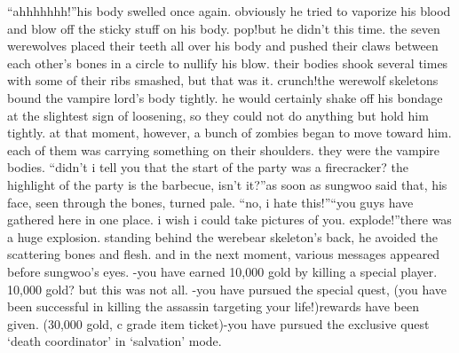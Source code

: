 “ahhhhhhh!”his body swelled once again.
 obviously he tried to vaporize his blood and blow off the sticky stuff on his body.
pop!but he didn’t this time.
 the seven werewolves placed their teeth all over his body and pushed their claws between each other’s bones in a circle to nullify his blow.
 their bodies shook several times with some of their ribs smashed, but that was it.
crunch!the werewolf skeletons bound the vampire lord’s body tightly.
 he would certainly shake off his bondage at the slightest sign of loosening, so they could not do anything but hold him tightly.
at that moment, however, a bunch of zombies began to move toward him.
 each of them was carrying something on their shoulders.
 they were the vampire bodies.
“didn’t i tell you that the start of the party was a firecracker? the highlight of the party is the barbecue, isn’t it?”as soon as sungwoo said that, his face, seen through the bones, turned pale.
“no, i hate this!”“you guys have gathered here in one place.
 i wish i could take pictures of you.
 explode!”there was a huge explosion.
 standing behind the werebear skeleton’s back, he avoided the scattering bones and flesh.
and in the next moment, various messages appeared before sungwoo’s eyes.
-you have earned 10,000 gold by killing a special player.
10,000 gold? but this was not all.
-you have pursued the special quest,  (you have been successful in killing the assassin targeting your life!)rewards have been given.
 (30,000 gold, c grade item ticket)-you have pursued the exclusive quest ‘death coordinator’ in ‘salvation’ mode.

